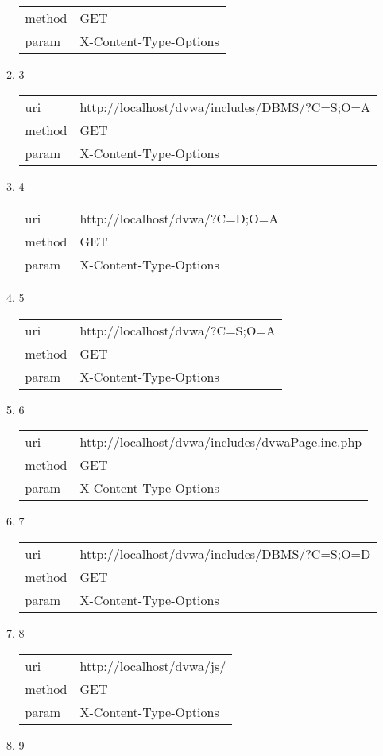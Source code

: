 \documentclass[10pt]{article}
\begin{document}
\begin{itemize}
\begin{enumerate}
\begin{tabular}{| l | p{14cm}}
method & GET \\
param & X-Content-Type-Options \\
\end{tabular}
\item[] 3
\begin{tabular}{| l | p{14cm}}
uri & http://localhost/dvwa/includes/DBMS/?C=S;O=A \\
method & GET \\
param & X-Content-Type-Options \\
\end{tabular}
\item[] 4
\begin{tabular}{| l | p{14cm}}
uri & http://localhost/dvwa/?C=D;O=A \\
method & GET \\
param & X-Content-Type-Options \\
\end{tabular}
\item[] 5
\begin{tabular}{| l | p{14cm}}
uri & http://localhost/dvwa/?C=S;O=A \\
method & GET \\
param & X-Content-Type-Options \\
\end{tabular}
\item[] 6
\begin{tabular}{| l | p{14cm}}
uri & http://localhost/dvwa/includes/dvwaPage.inc.php \\
method & GET \\
param & X-Content-Type-Options \\
\end{tabular}
\item[] 7
\begin{tabular}{| l | p{14cm}}
uri & http://localhost/dvwa/includes/DBMS/?C=S;O=D \\
method & GET \\
param & X-Content-Type-Options \\
\end{tabular}
\item[] 8
\begin{tabular}{| l | p{14cm}}
uri & http://localhost/dvwa/js/ \\
method & GET \\
param & X-Content-Type-Options \\
\end{tabular}
\item[] 9
\begin{tabular}{| l | p{14cm}}

\end{tabular}
\end{enumerate}
\end{itemize}
\end{document}
